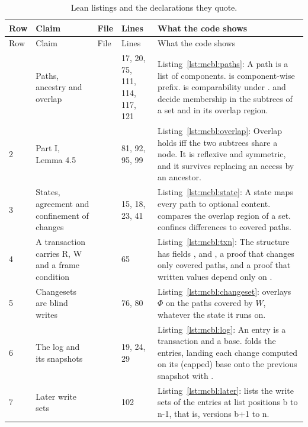 \documentclass[11pt,letterpaper]{article}
\theoremstyle{definition}
\theoremstyle{remark}
\begin{document}
\begin{small}
\begin{longtable}{@{}L{0.8cm}L{3.4cm}L{3.6cm}L{1.3cm}L{5.4cm}@{}}
\caption{Lean listings and the declarations they quote.}\label{tab:mcbl:evidence}\\
\toprule
Row & Claim & File & Lines & What the code shows \\
\midrule
\endfirsthead
\toprule
Row & Claim & File & Lines & What the code shows \\
\midrule
\endhead
\bottomrule
{} & Paths, ancestry and overlap &  & 17, 20, 75, 111, 114, 117, 121 & Listing~\ref{lst:mcbl:paths}: A path is a list of components.  is component-wise prefix.  is comparability under .  and  decide membership in the subtrees of a set and in its overlap region. \\
2 & Part I, Lemma 4.5 &  & 81, 92, 95, 99 & Listing~\ref{lst:mcbl:overlap}: Overlap holds iff the two subtrees share a node. It is reflexive and symmetric, and it survives replacing an access by an ancestor. \\
3 & States, agreement and confinement of changes &  & 15, 18, 23, 41 & Listing~\ref{lst:mcbl:state}: A state maps every path to optional content.  compares the overlap region of a set.  confines differences to covered paths. \\
4 & A transaction carries R, W and a frame condition &  & 65 & Listing~\ref{lst:mcbl:txn}: The structure has fields ,  and , a  proof that  changes only covered paths, and a  proof that written values depend only on . \\
5 & Changesets are blind writes &  & 76, 80 & Listing~\ref{lst:mcbl:changeset}:  overlays $\Phi$ on the paths covered by $W$, whatever the state it runs on. \\
6 & The log and its snapshots &  & 19, 24, 29 & Listing~\ref{lst:mcbl:log}: An entry is a transaction and a base.  folds the entries, landing each change computed on its (capped) base onto the previous snapshot with . \\
7 & Later write sets &  & 102 & Listing~\ref{lst:mcbl:later}:  lists the write sets of the entries at list positions b to n-1, that is, versions b+1 to n. \\

\end{longtable}
\end{small}
\end{document}
